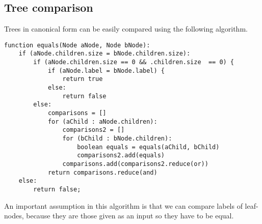 \documentclass[a4paper,10pt]{article}
\begin{document}
\subsection{Tree comparison}
Trees in canonical form can be easily compared using the following algorithm.
\begin{lstlisting}[caption={Comparing trees.}]
function equals(Node aNode, Node bNode):
    if (aNode.children.size = bNode.children.size):
        if (aNode.children.size == 0 && .children.size  == 0) {
            if (aNode.label = bNode.label) {
                return true
            else:
                return false
        else:
            comparisons = []
            for (aChild : aNode.children):
                comparisons2 = []
                for (bChild : bNode.children):
                    boolean equals = equals(aChild, bChild)
                    comparisons2.add(equals)
                comparisons.add(comparisons2.reduce(or))
            return comparisons.reduce(and)
    else:
        return false;
\end{lstlisting}
An important assumption in this algorithm is that we can compare labels of leaf-nodes, because they are those given as an input so they have to be equal.
\end{document}
